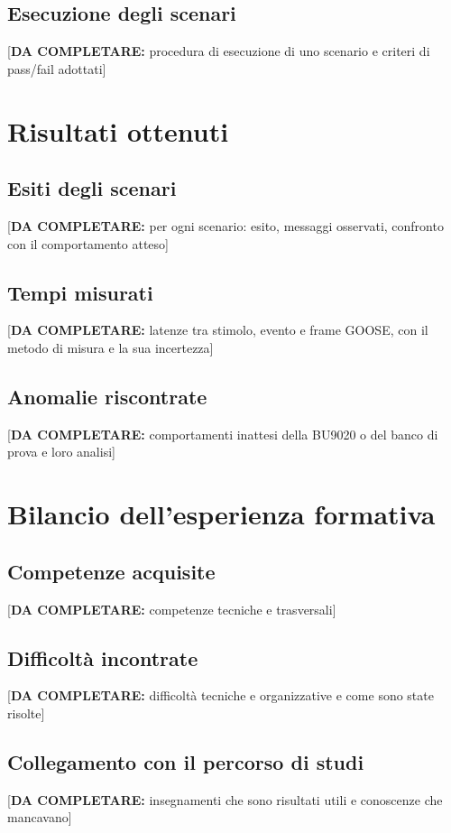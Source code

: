 \documentclass[11pt,a4paper,italian,oneside,openany]{book}
\newcommand{\daf}[1]{{\color{red}[\textbf{DA COMPLETARE:} #1]}}
\begin{document}
\section{Esecuzione degli scenari}
\daf{procedura di esecuzione di uno scenario e criteri di pass/fail adottati}

\chapter{Risultati ottenuti}\label{cap:risultati}
\section{Esiti degli scenari}
\daf{per ogni scenario: esito, messaggi osservati, confronto con il comportamento atteso}

\section{Tempi misurati}
\daf{latenze tra stimolo, evento e frame GOOSE, con il metodo di misura e la sua incertezza}

\section{Anomalie riscontrate}
\daf{comportamenti inattesi della BU9020 o del banco di prova e loro analisi}

\chapter{Bilancio dell'esperienza formativa}\label{cap:bilancio}
\section{Competenze acquisite}
\daf{competenze tecniche e trasversali}

\section{Difficoltà incontrate}
\daf{difficoltà tecniche e organizzative e come sono state risolte}

\section{Collegamento con il percorso di studi}
\daf{insegnamenti che sono risultati utili e conoscenze che mancavano}
\end{document}
